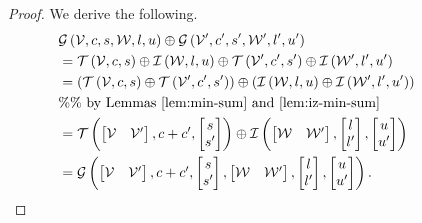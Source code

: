 %
\begin{proof}
  We derive the following.
  \begin{align*}
& \mathcal{G}\left(\mathcal{V},c,s,\mathcal{W},l,u\right)\oplus \mathcal{G}\left(\mathcal{V}^\prime,c^\prime,s^\prime,\mathcal{W}^\prime,l^\prime,u^\prime\right)\\
& =
    \mathit{\operatorname{\mathcal{T}}}\left(\mathcal{V},c,s\right)\oplus \mathit{\operatorname{\mathcal{I}}}\left(\mathcal{W},l,u\right)
    \oplus\mathit{\operatorname{\mathcal{T}}}\left(\mathcal{V}^\prime,c^\prime,s^\prime\right)\oplus \mathit{\operatorname{\mathcal{I}}}\left(\mathcal{W}^\prime,l^\prime,u^\prime\right)\\
&
    =\left(\mathit{\operatorname{\mathcal{T}}}\left(\mathcal{V},c,s\right)\oplus \mathit{\operatorname{\mathcal{T}}}\left(\mathcal{V}^\prime,c^\prime,s^\prime\right)\right)
    \oplus\left(\mathit{\operatorname{\mathcal{I}}}\left(\mathcal{W},l,u\right)\oplus \mathit{\operatorname{\mathcal{I}}}\left(\mathcal{W}^\prime,l^\prime,u^\prime\right)\right)\\
    & \%\%~\text{by Lemmas~\ref{lem:min-sum} and~\ref{lem:iz-min-sum}}\\
& = \mathit{\operatorname{\mathcal{T}}}\left(\begin{bmatrix}\mathcal{V} &
          \mathcal{V}^\prime\end{bmatrix},c+c^\prime,\begin{bmatrix}s\\s^\prime\end{bmatrix}\right)\oplus \mathit{\operatorname{\mathcal{I}}}\left(\left[\begin{matrix}\mathcal{W} &
                   \mathcal{W}^\prime\end{matrix}\right],\left[\begin{matrix}l\\l^\prime\end{matrix}\right],\left[\begin{matrix}u\\u^\prime\end{matrix}\right]\right)\\
& =  \mathcal{G}\left(\left[\begin{matrix}
    \mathcal{V} &
    \mathcal{V}^\prime
  \end{matrix}\right]
,\begin{matrix}
    c+c^\prime
  \end{matrix}
,\left[\begin{matrix}
    s\\
    s^\prime
  \end{matrix}\right]
,\left[\begin{matrix}
    \mathcal{W} &
    \mathcal{W}^\prime
  \end{matrix}\right]
,\left[\begin{matrix}
    l\\
    l^\prime
  \end{matrix}\right]
,\left[\begin{matrix}
    u\\
    u^\prime
  \end{matrix}\right]
\right).~~~~~~~~~~~~~~~~~~~\qedhere            
    \end{align*}
%
\end{proof}
